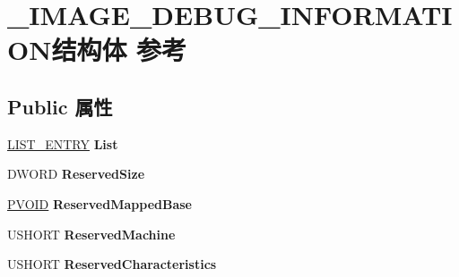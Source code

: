 \hypertarget{struct___i_m_a_g_e___d_e_b_u_g___i_n_f_o_r_m_a_t_i_o_n}{}\section{\+\_\+\+I\+M\+A\+G\+E\+\_\+\+D\+E\+B\+U\+G\+\_\+\+I\+N\+F\+O\+R\+M\+A\+T\+I\+O\+N结构体 参考}
\label{struct___i_m_a_g_e___d_e_b_u_g___i_n_f_o_r_m_a_t_i_o_n}
\subsection*{Public 属性}
\begin{DoxyCompactItemize}
\item 
\mbox{\label{struct___i_m_a_g_e___d_e_b_u_g___i_n_f_o_r_m_a_t_i_o_n_a2d35168eea7f69a4c6bfe42c91121092}} 
\hyperlink{struct___l_i_s_t___e_n_t_r_y}{L\+I\+S\+T\+\_\+\+E\+N\+T\+RY} {\bfseries List}
\item 
\mbox{\label{struct___i_m_a_g_e___d_e_b_u_g___i_n_f_o_r_m_a_t_i_o_n_a60f8668e24ba3169439bb2985c71d275}} 
D\+W\+O\+RD {\bfseries Reserved\+Size}
\item 
\mbox{\label{struct___i_m_a_g_e___d_e_b_u_g___i_n_f_o_r_m_a_t_i_o_n_a8bfbc78ef0db91c01007793a9f732adc}} 
\hyperlink{interfacevoid}{P\+V\+O\+ID} {\bfseries Reserved\+Mapped\+Base}
\item 
\mbox{\label{struct___i_m_a_g_e___d_e_b_u_g___i_n_f_o_r_m_a_t_i_o_n_a8b7ddc0d914de7f3399128d7776d2cad}} 
U\+S\+H\+O\+RT {\bfseries Reserved\+Machine}
\item 
\mbox{\label{struct___i_m_a_g_e___d_e_b_u_g___i_n_f_o_r_m_a_t_i_o_n_a574b63f856f47f01cf84aa6e8d833a31}} 
U\+S\+H\+O\+RT {\bfseries Reserved\+Characteristics}
\item 
\mbox{\label{struct___i_m_a_g_e___d_e_b_u_g___i_n_f_o_r_m_a_t_i_o_n_a463a9c53be9c048443777173172ba158}} 

\end{DoxyCompactItemize}

